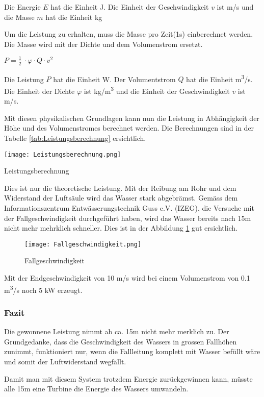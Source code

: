 Die Energie \(E\) hat die Einheit \si{J}. Die Einheit der Geschwindigkeit \(v\) ist \si{m/s} und die Masse \(m\) hat die Einheit \si{kg}

Um die Leistung zu erhalten, muss die Masse pro Zeit(1s) einberechnet werden. Die Masse wird  mit der Dichte und dem Volumenstrom ersetzt.

\begin{center}
\(P =\frac 12\ \cdot \varphi \cdot Q \cdot v^2\)
\end{center}

Die Leistung \(P\) hat die Einheit \si{W}. Der Volumentstrom \(Q\) hat die Einheit \si{m^3/s}. Die Einheit der Dichte \(\varphi\) ist \si{kg/m^3} und die Einheit der Geschwindigkeit \(v\) ist \si{m/s}.

\bigskip


Mit diesen physikalischen Grundlagen kann nun die Leistung in Abhängigkeit der Höhe und des Volumenstromes berechnet werden.  Die Berechnungen sind in der Tabelle  \ref{tab:Leistungsberechnung}  ersichtlich.

\begin{table} [H]
	\centering
	\texttt{[image: Leistungsberechnung.png]}
	\caption{Leistungsberechnung}
	\label{tab:Leistungsberechnung}
\end{table}

\newpage

Dies ist nur die theoretische Leistung. Mit der Reibung am Rohr und dem Widerstand der Luftsäule wird das Wasser stark abgebrämst. Gemäss dem Informationszentrum Entwässerungstechnik Guss e.V. (IZEG), die Versuche mit der Fallgeschwindigkeit durchgeführt haben, wird das Wasser bereits nach 15\si{m} nicht mehr mehrklich schneller. Dies ist in der Abbildung \ref{fig:Fallgeschwindigkeit}  gut ersichtlich.

\begin{figure} [H]
	\centering
	\texttt{[image: Fallgeschwindigkeit.png]}
	\caption{Fallgeschwindigkeit \cite{Izeg}}
	\label{fig:Fallgeschwindigkeit}
\end{figure}


Mit der Endgeschwindigkeit von 10 \si{m/s} wird bei einem Volumenstrom von 0.1 \si{m^3/s} noch 5 \si{kW} erzeugt.

\subsubsection{Fazit}

Die gewonnene Leistung nimmt ab ca. 15\si{m} nicht mehr merklich zu. Der Grundgedanke, dass die Geschwindigkeit des Wassers in grossen Fallhöhen zunimmt, funktioniert nur, wenn die Fallleitung komplett mit Wasser befüllt wäre und somit der Luftwiderstand wegfällt.

Damit man mit diesem System trotzdem Energie zurückgewinnen kann, müsste alle 15\si{m} eine Turbine die Energie des Wassers umwandeln.

\clearpage 





